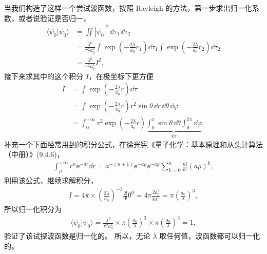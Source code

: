 当我们构造了这样一个尝试波函数，按照 Rayleigh 的方法，第一步求出归一化系数，或者说验证是否归一，
\begin{align}
    \langle \psi_0 | \psi_0 \rangle &= \iint |\psi_0|^2 \,\dd\tau_1\,\dd\tau_2 \\
    &= \frac{\lambda^6}{\pi^2a_0^6} 
    \int \exp\!\left(-\frac{2\lambda}{a_0}r_1\right)\dd\tau_1 
    \int \exp\!\left(-\frac{2\lambda}{a_0}r_2\right)\dd\tau_2 
    \\
    &= \frac{\lambda^6}{\pi^2a_0^6} I^2,
\end{align}
接下来求其中的这个积分 $I$，在极坐标下更方便
\begin{align}
    I &= \int \exp\left(- \frac{2\lambda}{a_0} r\right) \dd\tau \\
    &= \int \exp\left(- \frac{2\lambda}{a_0} r\right) r^2 \sin\theta\,\dd r\,\dd\theta\,\dd\varphi \\
    &= \int_0^{+\infty} r^2 \exp\left(- \frac{2\lambda}{a_0} r\right) 
    \underbrace{\int_0^\pi \sin\theta\,\dd\theta \int_0^{2\pi} \dd\varphi}_{4\pi},
\end{align}
补充一个下面经常用到的积分公式，在徐光宪《量子化学：基本原理和从头计算法（中册）》(9.4.6)，
\begin{align}
    \int_\rho^{+\infty} r^n \ee^{-ar} \dd r = a^{-(n+1)} \ee^{-a\rho} \ee^{-a\rho} \sum_{k=0}^n \frac{n!}{k!}(a\rho)^k,
\end{align}
利用该公式，继续求解积分，
\begin{align}
    I = 4\pi \times \left(\frac{2\lambda}{a_0}\right)^{-3} \frac{2!}{0!} 0^0 = 4\pi \frac{2a_0^3}{8\lambda^3} = \pi\left(\frac{a_0}{\lambda}\right)^3,
\end{align}
所以归一化积分为
\begin{align}
    \langle \psi_0 | \psi_0 \rangle = \frac{\lambda^6}{\pi^2a_0^6} \times \pi\left(\frac{a_0}{\lambda}\right)^3 \times \pi\left(\frac{a_0}{\lambda}\right)^3 = 1,
\end{align}
验证了该试探波函数是归一化的。
所以，无论 $\lambda$ 取任何值，波函数都可以归一化的。

